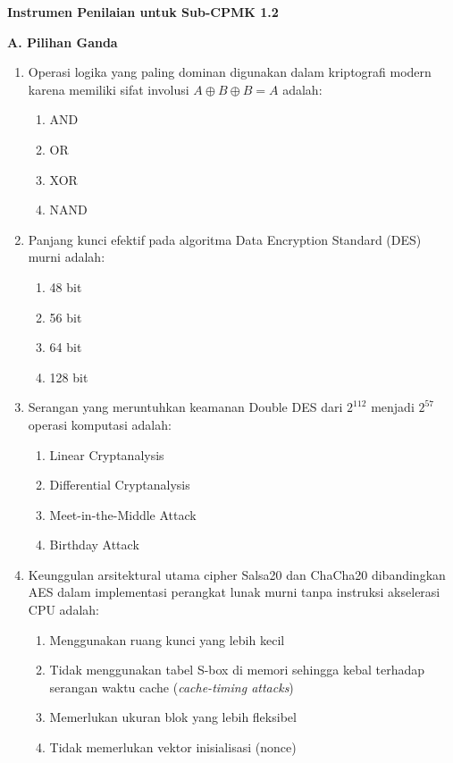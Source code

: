\documentclass[main.tex]{subfiles}
\begin{document}
\begin{asesmen}
\textbf{Instrumen Penilaian untuk Sub-CPMK 1.2}

\textbf{A. Pilihan Ganda}

\begin{enumerate}
  \item Operasi logika yang paling dominan digunakan dalam kriptografi modern karena memiliki sifat involusi $A \oplus B \oplus B = A$ adalah:
  \begin{enumerate}
    \item AND
    \item OR
    \item XOR
    \item NAND
  \end{enumerate}

  \item Panjang kunci efektif pada algoritma Data Encryption Standard (DES) murni adalah:
  \begin{enumerate}
    \item 48 bit
    \item 56 bit
    \item 64 bit
    \item 128 bit
  \end{enumerate}

  \item Serangan yang meruntuhkan keamanan Double DES dari $2^{112}$ menjadi $2^{57}$ operasi komputasi adalah:
  \begin{enumerate}
    \item Linear Cryptanalysis
    \item Differential Cryptanalysis
    \item Meet-in-the-Middle Attack
    \item Birthday Attack
  \end{enumerate}

  \item Keunggulan arsitektural utama cipher Salsa20 dan ChaCha20 dibandingkan AES dalam implementasi perangkat lunak murni tanpa instruksi akselerasi CPU adalah:
  \begin{enumerate}
    \item Menggunakan ruang kunci yang lebih kecil
    \item Tidak menggunakan tabel S-box di memori sehingga kebal terhadap serangan waktu cache (\textit{cache-timing attacks})
    \item Memerlukan ukuran blok yang lebih fleksibel
    \item Tidak memerlukan vektor inisialisasi (nonce)
  \end{enumerate}


\end{enumerate}
\end{asesmen}
\end{document}
